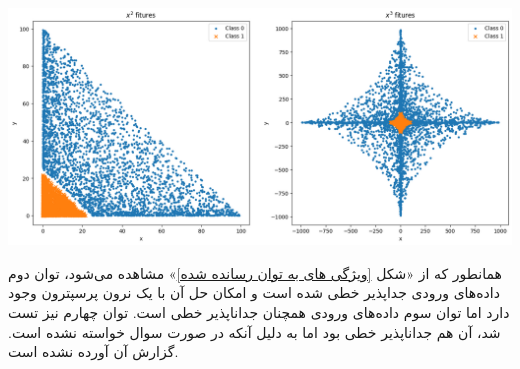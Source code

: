 \begin{enumerate}
\begin{qsolve}
		\begin{center}
			\includegraphics*[width=1\linewidth]{pics/img10.png}
			\label{ویژگی های به توان رسانده شده}
		\end{center}
		
		همانطور که از «شکل \ref{ویژگی های به توان رسانده شده}» مشاهده می‌شود، توان دوم داده‌های ورودی جداپذیر خطی شده است و امکان حل آن با یک نرون پرسپترون وجود دارد اما توان سوم داده‌های ورودی همچنان جداناپذیر خطی است. توان چهارم نیز تست شد، آن هم جداناپذیر خطی بود اما به دلیل آنکه در صورت سوال خواسته نشده است. گزارش آن آورده نشده است.
		
		
	\end{qsolve}
	
	
\end{enumerate}








































